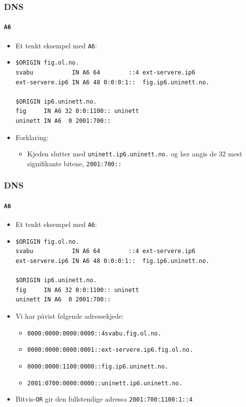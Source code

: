 \begin{frame}[fragile]%
  \frametitle{DNS}
  \framesubtitle{\texttt{A6}}
  \begin{itemize}%
  \item Et tenkt eksempel med \texttt{A6}:
  \item 
\begin{verbatim}
$ORIGIN fig.ol.no.
svabu           IN A6 64        ::4 ext-servere.ip6
ext-servere.ip6 IN A6 48 0:0:0:1::  fig.ip6.uninett.no.

$ORIGIN ip6.uninett.no.
fig     IN A6 32 0:0:1100:: uninett
uninett IN A6  0 2001:700::
\end{verbatim}
  \item Forklaring:
    \begin{itemize}%
    \item Kjeden slutter med \texttt{uninett.ip6.uninett.no.} og her
      angis de 32 mest signifikante bitene, \texttt{2001:700::}
    \end{itemize}
  \end{itemize}
\end{frame}

\begin{frame}[fragile]%
  \frametitle{DNS}
  \framesubtitle{\texttt{A6}}
  \begin{itemize}%
  \item Et tenkt eksempel med \texttt{A6}:
  \item 
\begin{verbatim}
$ORIGIN fig.ol.no.
svabu           IN A6 64        ::4 ext-servere.ip6
ext-servere.ip6 IN A6 48 0:0:0:1::  fig.ip6.uninett.no.

$ORIGIN ip6.uninett.no.
fig     IN A6 32 0:0:1100:: uninett
uninett IN A6  0 2001:700::
\end{verbatim}
    \item Vi har påvist følgende adressekjede:
      \begin{itemize}%
      \item \texttt{0000:0000:0000:0000::\alert{4}}\hfill\texttt{svabu.fig.ol.no.}
      \item \texttt{0000:0000:0000:000\alert{1}::}\hfill\texttt{ext-servere.ip6.fig.ol.no.}
      \item \texttt{0000:0000:\alert{1100}:0000::}\hfill\texttt{fig.ip6.uninett.no.}
      \item \texttt{\alert{2001}:0\alert{700}:0000:0000::}\hfill\texttt{uninett.ip6.uninett.no.}
      \end{itemize}
    \item Bitvis-\texttt{OR} gir den fullstendige adressa \texttt{2001:700:1100:1::4}
  \end{itemize}
\end{frame}

